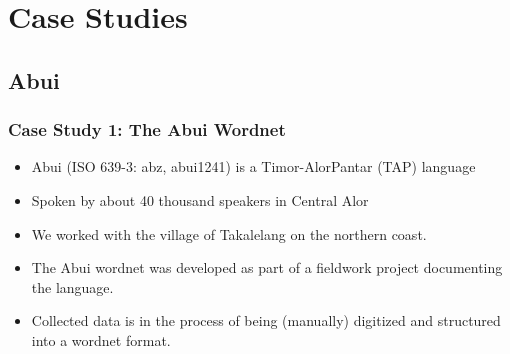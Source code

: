 \documentclass[xetex]{beamer}  %
\begin{document}


\section{Case Studies}

\subsection{Abui}

\begin{frame}
\frametitle{Case Study 1: The Abui Wordnet}
\begin{itemize}
    \item Abui (ISO 639-3: abz, abui1241) is a Timor-AlorPantar (TAP) language \citep{Kratochvil:2007}
    \item Spoken by about 40 thousand speakers in Central Alor
    \item  We worked with the village of Takalelang on the northern coast.
    \item The Abui wordnet was developed as part of a fieldwork project documenting the language.
    \item Collected data is in the process of being (manually) digitized and structured into a wordnet format.
\end{itemize}
\end{frame}
\end{document}
